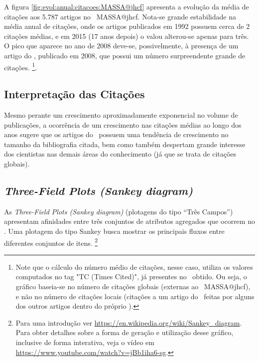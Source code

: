 A figura \ref{fig:evol:anual:citacoes:MASSA@jhcf} apresenta a evolução da média de citações aos 5.787 artigos no \dataset\   MASSA@jhcf. 
Nota-se grande estabilidade na média anual de citações, onde os artigos publicados em 1992 possuem cerca de 2 citações médias, e em 2015 (17 anos depois) o valou alterou-se apenas para três. O pico que aparece no ano de 2008 deve-se, possivelmente, à presença de um artigo do \dataset, publicado em 2008, que possui um número surpreendente grande de citações. \footnote{Note que o cálculo do número  médio de citações, nesse caso, utiliza os valores computados no tag "TC (Times Cited)", já presentes no \dataset\   obtido. Ou seja, o gráfico baseia-se no número de citações globais (externas ao \dataset\   MASSA@jhcf), e não no número de citações locais (citações a um artigo do \dataset\   feitas por alguns dos outros artigos dentro do próprio \dataset).}.

\subsection{Interpretação das Citações}
Mesmo perante um crescimento aproximadamente exponencial no volume de publicações, a ocorrência de um crescimento nas citações médias ao longo dos anos sugere que os artigos do \dataset\   possuem uma tendência de crescimento no tamanho da bibliografia citada, bem como também despertam grande interesse dos cientistas nas demais áreas do conhecimento (já que se trata de citações globais).

\subsection{\textit{Three-Field Plots (Sankey diagram)}}

As \textit{Three-Field Plots (Sankey diagram)} (plotagens do tipo ``Três Campos'') apresentam afinidades entre três conjuntos de atributos agregados que ocorrem no \dataset. Uma plotagem do tipo Sankey busca mostrar os principais fluxos entre diferentes conjuntos de itens. \footnote{Para uma introdução ver \url{https://en.wikipedia.org/wiki/Sankey_diagram}. Para obter detalhes sobre a forma de geração e utilização desse gráfico, inclusive de forma interativa, veja o vídeo em \url{https://www.youtube.com/watch?v=jBb1iha6-sg}.} 

